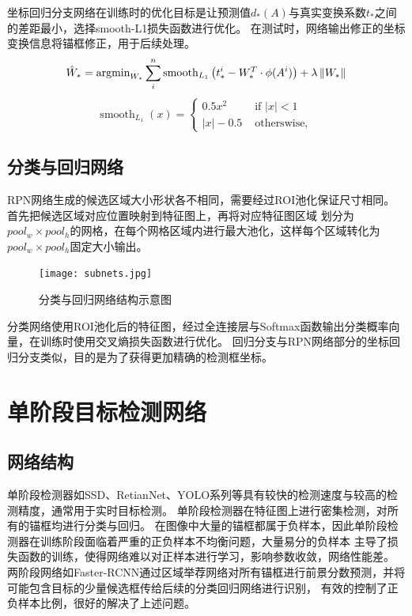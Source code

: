 坐标回归分支网络在训练时的优化目标是让预测值$d_{*}(A)$与真实变换系数$t_{*}$之间的差距最小，选择smooth-L1损失函数进行优化。
在测试时，网络输出修正的坐标变换信息将锚框修正，用于后续处理。
\begin{equation}
  {\hat W_*} = {{\mathop{\rm argmin}\nolimits} _{{W_*}}}\sum\limits_i^n {{{{\mathop{\rm smooth}\nolimits} }_{{L_1}}}
  \left( {t_*^i - W_*^T \cdot \phi ({A^i})} \right)}  + \lambda \left\| {{W_*}} \right\|
  \label{eq:bbox_reg3}
\end{equation}
\begin{equation}
  \operatorname{smooth}_{L_{1}}(x)
  =\left\{\begin{array}{rr} 0.5 x^{2} & \text { if }|x|<1 \\ |x|-0.5 & \text { otherswise, } \end{array}\right.
  \label{eq:bbox_reg4}
\end{equation}

\subsection{分类与回归网络}
RPN网络生成的候选区域大小形状各不相同，需要经过ROI池化保证尺寸相同。首先把候选区域对应位置映射到特征图上，再将对应特征图区域
划分为$pool_w \times pool_h$的网格，在每个网格区域内进行最大池化，这样每个区域转化为$pool_w \times pool_h$固定大小输出。

\begin{figure}[htbp]                  
  \centering                   
  \texttt{[image: subnets.jpg]}                   
  \caption{分类与回归网络结构示意图}                   
  \label{fig:subnets}      
\end{figure}   

分类网络使用ROI池化后的特征图，经过全连接层与Softmax函数输出分类概率向量，在训练时使用交叉熵损失函数进行优化。
回归分支与RPN网络部分的坐标回归分支类似，目的是为了获得更加精确的检测框坐标。

\section{单阶段目标检测网络}

\subsection{网络结构}
单阶段检测器如SSD、RetianNet、YOLO系列等具有较快的检测速度与较高的检测精度，通常用于实时目标检测。
单阶段检测器在特征图上进行密集检测，对所有的锚框均进行分类与回归。
在图像中大量的锚框都属于负样本，因此单阶段检测器在训练阶段面临着严重的正负样本不均衡问题，大量易分的负样本
主导了损失函数的训练，使得网络难以对正样本进行学习，影响参数收敛，网络性能差。
两阶段网络如Faster-RCNN通过区域举荐网络对所有锚框进行前景分数预测，并将可能包含目标的少量候选框传给后续的分类回归网络进行识别，
有效的控制了正负样本比例，很好的解决了上述问题。

